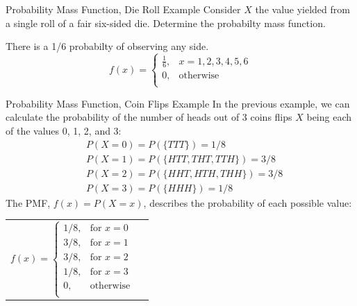 \documentclass[handout]{beamer}
\begin{document}
\begin{frame}{Probability Mass Function, Die Roll Example}
    Consider $X$ the value yielded from a single roll of a fair six-sided die. Determine the probabilty mass function.

    \pause There is a 1/6 probabilty of observing any side.
    $$
    f(x)= \left\{\begin{array}{lr}
        \frac{1}{6}, & x = 1,2,3,4,5,6\\
        0, & \text{otherwise}\\
        \end{array}\right.$$
\hfill
    \end{frame}

\begin{frame}{Probability Mass Function, Coin Flips Example}
    In the previous example, we can calculate the probability of the number of heads out of 3 coins flips $X$ being each of the values 0, 1, 2, and 3:
    \begin{align*}
    &P(X=0) = P(\{TTT\}) = 1/8 \\
    &P(X=1) = P(\{HTT, THT, TTH \}) = 3/8 \\
    &P(X=2) = P(\{HHT, HTH, THH\}) = 3/8 \\
    &P(X=3) = P(\{HHH\}) = 1/8
    \end{align*}
    \pause The PMF, $f(x)=P(X=x)$, describes the probability of each possible value:
    \begin{center}
    \begin{tabular}{p{6cm}p{6cm}}
    \vspace{-1cm}
    $$
    f(x)= \left\{\begin{array}{lr}
        1/8, & \text{for } x = 0\\
        3/8, & \text{for } x = 1\\
        3/8, & \text{for } x = 2\\
        1/8, & \text{for } x = 3\\
        0, & \text{otherwise}\\
        \end{array}\right.$$&
    \vspace{-2cm}

\end{tabular}
\end{center}
\end{frame}
\end{document}
